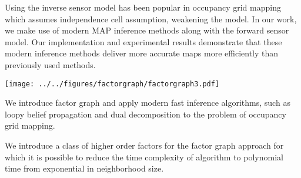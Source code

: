 \documentclass[final]{beamer}
\begin{document}

  \maketitle

  \begin{multicols}{3}


    \begin{minipage}[c]{0.4\columnwidth}
      Using the inverse sensor model has been popular in occupancy grid mapping
      which assumes independence cell assumption, weakening the model. In our
      work, we make use of modern MAP inference methods along with the forward
      sensor model. Our implementation and experimental results demonstrate
      that these modern inference methods deliver more accurate maps more
      efficiently than previously used methods.
    \end{minipage}
    \hspace{0.5in}
    \begin{minipage}[r]{\dimexpr0.6\columnwidth-0.5in\relax}
      \begin{center}
      \texttt{[image: ../../figures/factorgraph/factorgraph3.pdf]}
      \label{fig:factor-graph}
      \end{center}
    \end{minipage}


    \begin{packedEnumerate}
      \item We introduce factor graph and apply modern fast inference
        algorithms, such as loopy belief propagation
        \cite{kschischang2001factor} and dual decomposition
        \cite{sontag2011introduction} to the problem of occupancy grid mapping.

      \item We introduce a class of higher order factors for the factor graph
        approach for which it is possible to reduce the time complexity of algorithm to polynomial
        time from exponential in neighborhood size.


\end{packedEnumerate}
\end{multicols}
\end{document}

